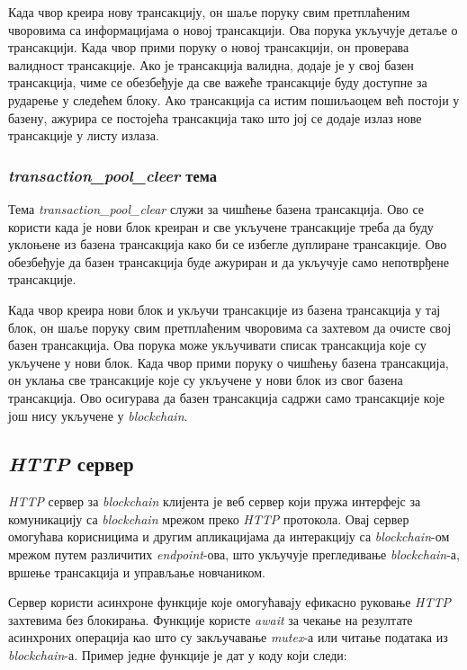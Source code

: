 \documentclass[12pt, a4paper]{article}
\begin{document}
Када чвор креира нову трансакцију, он шаље поруку свим претплаћеним чворовима са информацијама о новој трансакцији. Ова порука укључује детаље о трансакцији. Када чвор прими поруку о новој трансакцији, он проверава валидност трансакције. Ако је трансакција валидна, додаје је у свој базен трансакција, чиме се обезбеђује да све важеће трансакције буду доступне за рударење у следећем блоку. Ако трансакција са истим пошиљаоцем већ постоји у базену, ажурира се постојећа трансакција тако што јој се додаје излаз нове трансакције у листу излаза.


\subsubsection{\textbf{\textit{transaction\_pool\_cleer}} тема}
Тема \textit{transaction\_pool\_clear} служи за чишћење базена трансакција. Ово се користи када је нови блок креиран и све укључене трансакције треба да буду уклоњене из базена трансакција како би се избегле дуплиране трансакције. Ово обезбеђује да базен трансакција буде ажуриран и да укључује само непотврђене трансакције.

Када чвор креира нови блок и укључи трансакције из базена трансакција у тај блок, он шаље поруку свим претплаћеним чворовима са захтевом да очисте свој базен трансакција. Ова порука може укључивати списак трансакција које су укључене у нови блок.
Када чвор прими поруку о чишћењу базена трансакција, он уклања све трансакције које су укључене у нови блок из свог базена трансакција. Ово осигурава да базен трансакција садржи само трансакције које још нису укључене у \textit{blockchain}.
\newpage
\subsection{\textit{HTTP} сервер}
\textit{HTTP} сервер за \textit{blockchain} клијента је веб сервер који пружа интерфејс за комуникацију са \textit{blockchain} мрежом преко \textit{HTTP} протокола. Овај сервер омогућава корисницима и другим апликацијама да интеракцију са \textit{blockchain}-ом мрежом путем различитих \textit{endpoint}-ова, што укључује прегледивање \textit{blockchain}-а, вршење трансакција и управљање новчаником.

Сервер користи асинхроне функције које омогућавају ефикасно руковање \textit{HTTP} захтевима без блокирања. Функције користе \textit{await} за чекање на резултате асинхроних операција као што су закључавање \textit{mutex}-а или читање података из \textit{blockchain}-а. Пример једне функције је дат у коду који следи:
\end{document}
